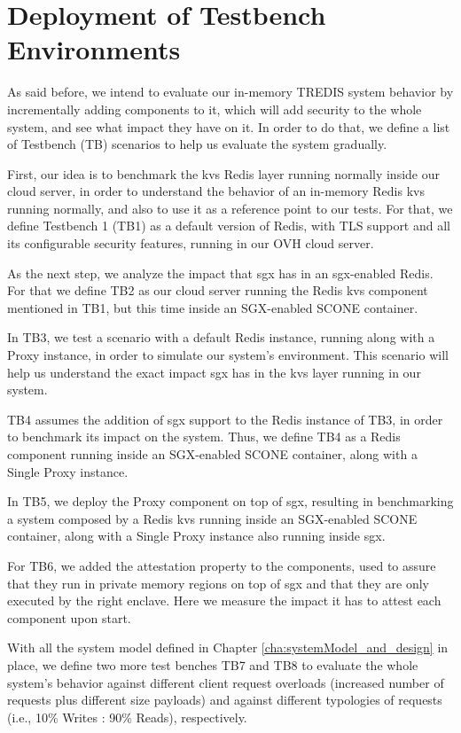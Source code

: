 \section{Deployment of Testbench Environments}
\label{sec:testBenchEnvironments}

As said before, we intend to evaluate our in-memory TREDIS system behavior by incrementally adding components to it, which will add security to the whole system, and see what impact they have on it. In order to do that, we define a list of Testbench (TB) scenarios to help us evaluate the system gradually.

First, our idea is to benchmark the \gls{kvs} Redis layer running normally inside our cloud server, in order to understand the behavior of an in-memory Redis \gls{kvs} running normally, and also to use it as a reference point to our tests. For that, we define Testbench 1 (TB1) as a default version of Redis, with TLS support and all its configurable security features, running in our OVH cloud server.

As the next step, we analyze the impact that \gls{sgx} has in an \gls{sgx}-enabled Redis. For that we define TB2 as our cloud server running the Redis \gls{kvs} component mentioned in TB1, but this time inside an SGX-enabled SCONE container.

In TB3, we test a scenario with a default Redis instance, running along with a Proxy instance, in order to simulate our system's environment. This scenario will help us understand the exact impact \gls{sgx} has in the \gls{kvs} layer running in our system.

TB4 assumes the addition of \gls{sgx} support to the Redis instance of TB3, in order to benchmark its impact on the system. Thus, we define TB4 as a Redis component running inside an SGX-enabled SCONE container, along with a Single Proxy instance.

In TB5, we deploy the Proxy component on top of \gls{sgx}, resulting in benchmarking a system composed by a Redis \gls{kvs} running inside an SGX-enabled SCONE container, along with a Single Proxy instance also running inside \gls{sgx}.

For TB6, we added the attestation property to the components, used to assure that they run in private memory regions on top of \gls{sgx} and that they are only executed by the right enclave. Here we measure the impact it has to attest each component upon start.

With all the system model defined in Chapter \ref{cha:systemModel_and_design} in place, we define two more test benches TB7 and TB8 to evaluate the whole system's behavior against different client request overloads (increased number of requests plus different size payloads) and against different typologies of requests (i.e., 10\% Writes : 90\% Reads), respectively.

